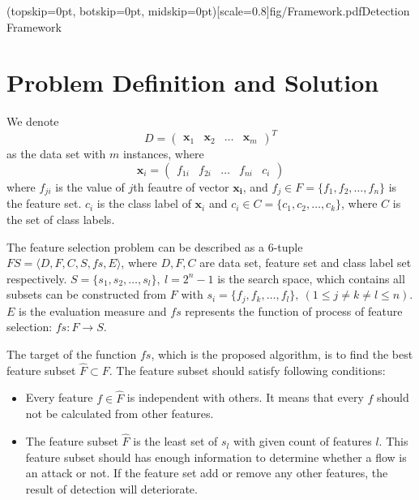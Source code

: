 \documentclass{ieeeaccess}
\theoremstyle{definition}
\begin{document}
\Figure[t!](topskip=0pt, botskip=0pt, midskip=0pt)[scale=0.8]{fig/Framework.pdf}{Detection Framework\label{fig:framework}}

\section{Problem Definition and Solution}
\label{sec:problem}
We denote 
$$D=\left(\begin{array}{llll}
    \bm{x}_1 & \bm{x}_2 & \ldots & \bm{x}_m
\end{array}\right)^T$$
as the data set with $m$ instances, where 
$$\bm{x}_i = \left(\begin{array}{lllll}
    f_{1i} & f_{2i} & \ldots & f_{ni} & c_i
\end{array}\right)$$
where $f_{ji}$ is the value of $j$th feautre of vector $\bm{x_i}$, and $f_j \in F = \{f_1, f_2, \ldots, f_n\}$ is the feature set. $c_i$ is the class label of $\bm{x}_i$ and $c_i \in C = \{c_1, c_2, \ldots, c_k\}$, where $C$ is the set of class labels.

The feature selection problem\cite{Maza2018} can be described as a 6-tuple $FS=\langle D, F, C, S, fs, E \rangle$, where $D, F, C$ are data set, feature set and class label set respectively. $S=\{s_1, s_2, \ldots, s_l\}, \ l=2^n-1$ is the search space, which contains all subsets can be constructed from $F$ with $s_i=\{f_j, f_k, \ldots, f_l\}, \ (1 \leqslant j \neq k \neq l \leqslant n)$. $E$ is the evaluation measure and $fs$ represents the function of process of feature selection: $fs: F \rightarrow S$.

The target of the function $fs$, which is the proposed algorithm, is to find the best feature subset $\hat{F} \subset F$. The feature subset should satisfy following conditions:
\begin{itemize}
    \item Every feature $f \in \hat{F}$ is independent with others. It means that every $f$ should not be calculated from other features.
    \item The feature subset $\hat{F}$ is the least set of $s_l$ with given count of features $l$. This feature subset should has enough information to determine whether a flow is an attack or not. If the feature set add or remove any other features, the result of detection will deteriorate.
\end{itemize}
\end{document}
